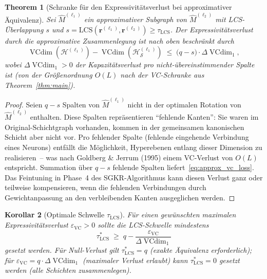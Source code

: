 ﻿\documentclass[12pt, a4paper, openany]{report}
\newtheorem{theorem}{Theorem}[chapter]
\newtheorem{corollary}[theorem]{Korollar}
\newcommand{\calH}{\mathcal{H}}
\newcommand{\calS}{\mathcal{S}}
\newcommand{\eps}{\varepsilon}
\DeclareMathOperator{\VC}{VCdim}
\begin{document}
\begin{theorem}[Schranke für den Expressivitätsverlust bei approximativer Äquivalenz]
\label{thm:expressivity_approx}
Sei $\hat{M}^{(\ell_1)}$ ein approximativer Subgraph von $\hat{M}^{(\ell_2)}$
mit LCS-Überlappung $s$ und $s = \mathrm{LCS}(\bm{r}^{(\ell_1)}, \bm{r}^{(\ell_2)}) \geq \tau_{\mathrm{LCS}}$.
Der Expressivitätsverlust durch die approximative Zusammenlegung ist nach oben
beschränkt durch
\begin{equation}
  \label{eq:approx_vc_loss}
  \VC(\calH^{(\ell_1)}) - \VC(\calH_{\calS}^{(\ell_1)})
  \;\leq\;
  \bigl(q - s\bigr) \cdot \Delta\VC_1,
\end{equation}
wobei $\Delta\VC_1 > 0$ der Kapazitätsverlust pro nicht-übereinstimmender
Spalte ist (von der Größenordnung $O(L)$ nach der VC-Schranke aus
Theorem~\ref{thm:main}).
\end{theorem}

\begin{proof}
Seien $q - s$ Spalten von $\hat{M}^{(\ell_1)}$ nicht in der optimalen Rotation
von $\hat{M}^{(\ell_2)}$ enthalten.  Diese Spalten repräsentieren
``fehlende Kanten'': Sie waren im Original-Schichtgraph vorhanden, kommen
in der gemeinsamen kanonischen Schicht aber nicht vor.  Pro fehlender
Spalte (fehlende eingehende Verbindung eines Neurons) entfällt die Möglichkeit,
Hyperebenen entlang dieser Dimension zu realisieren~-- was nach Goldberg \&
Jerrum (1995) einem VC-Verlust von $O(L)$ entspricht.  Summation über
$q - s$ fehlende Spalten liefert~\eqref{eq:approx_vc_loss}.  Das
Feintuning in Phase~4 des SGKR-Algorithmus kann diesen Verlust ganz oder
teilweise kompensieren, wenn die fehlenden Verbindungen durch Gewichtanpassung
an den verbleibenden Kanten ausgeglichen werden.
\end{proof}

\begin{corollary}[Optimale Schwelle $\tau_{\mathrm{LCS}}$]
\label{cor:optimal_tau}
Für einen gewünschten maximalen Expressivitätsverlust
$\eps_{\mathrm{VC}} > 0$ sollte die LCS-Schwelle mindestens
\[
  \tau_{\mathrm{LCS}}^*
  \;\geq\; q - \frac{\eps_{\mathrm{VC}}}{\Delta\VC_1}
\]
gesetzt werden.  Für Null-Verlust gilt $\tau_{\mathrm{LCS}}^* = q$ (exakte
Äquivalenz erforderlich); für $\eps_{\mathrm{VC}} = q \cdot \Delta\VC_1$
(maximaler Verlust erlaubt) kann $\tau_{\mathrm{LCS}}^* = 0$ gesetzt werden
(alle Schichten zusammenlegen).
\end{corollary}
\end{document}
